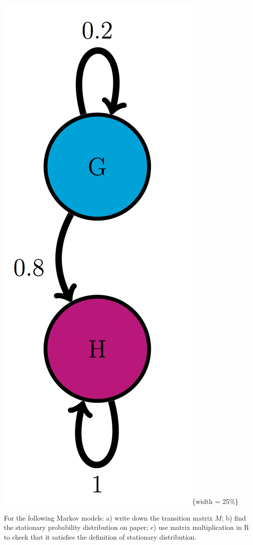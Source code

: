 \documentclass[
]{book}
\theoremstyle{definition}
\theoremstyle{definition}
\theoremstyle{definition}
\theoremstyle{remark}
\begin{document}
\includegraphics{ch10/GH_trans_diag.png}\{width = 25\%\}

For the following Markov models: a) write down the transition matrix \(M\); b) find the stationary probability distribution on paper; c) use matrix multiplication in R to check that it satisfies the definition of stationary distribution.
\end{document}
